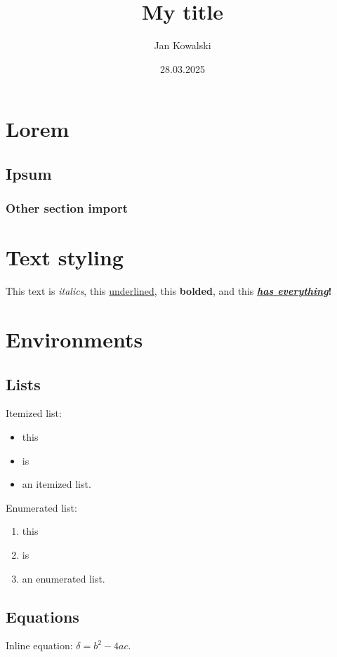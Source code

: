 \documentclass{pwrReport}
\title{My title}
\author{Jan Kowalski}
\date{28.03.2025}
\begin{document}
\maketitle
\tableofcontents

\newpage

\section{Lorem}
    \subsection{Ipsum}
        \subsubsection{Other section import}
            

\section{Text styling}
    This text is \textit{italics}, this \underline{underlined}, this \textbf{bolded}, and this
    \textbf{\textit{\underline{has everything}}!}


\section{Environments}
    \subsection{Lists}
        Itemized list:
        \begin{itemize}
            \item this
            \item is
            \item an itemized list.
        \end{itemize}

        Enumerated list:
        \begin{enumerate}
            \item this
            \item is
            \item an enumerated list.
        \end{enumerate}

    \subsection{Equations}
        Inline equation: $\delta=b^2-4ac$.
\end{document}
